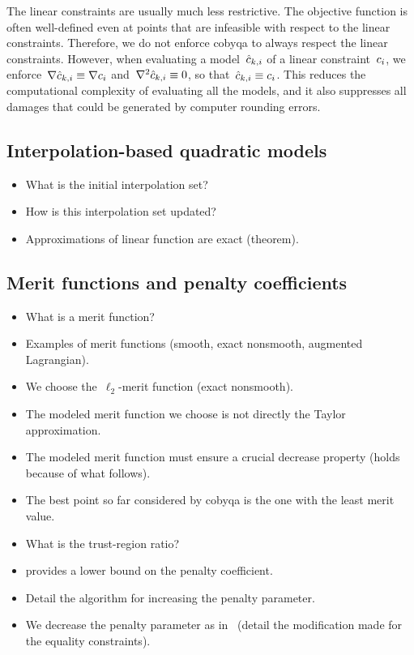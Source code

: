 The linear constraints are usually much less restrictive.
The objective function is often well-defined even at points that are infeasible with respect to the linear constraints.
Therefore, we do not enforce \gls{cobyqa} to always respect the linear constraints.
However, when evaluating a model~$\conm[k]{i}$ of a linear constraint~$c_{i}$, we enforce~$\nabla \conm[k]{i} \equiv \nabla \con{i}$ and~$\nabla^2 \conm[k]{i} \equiv 0$, so that~$\conm[k]{i} \equiv \con{i}$.
This reduces the computational complexity of evaluating all the models, and it also suppresses all damages that could be generated by computer rounding errors.

\subsection{Interpolation-based quadratic models}
\label{subsec:cobyqa-models}

\begin{itemize}
    \item What is the initial interpolation set?
    \item How is this interpolation set updated?
    \item Approximations of linear function are exact (theorem).
\end{itemize}

\subsection{Merit functions and penalty coefficients}
\label{subsec:cobyqa-merit-function}

\begin{itemize}
    \item What is a merit function?
    \item Examples of merit functions (smooth, exact nonsmooth, augmented Lagrangian).
    \item We choose the~$\ell_2$-merit function (exact nonsmooth).
    \item The modeled merit function we choose is not directly the Taylor approximation.
    \item The modeled merit function must ensure a crucial decrease property (holds because of what follows).
    \item The best point so far considered by \gls{cobyqa} is the one with the least merit value.
    \item What is the trust-region ratio?
    \item \Cite[Thm.~14.5.1]{Conn_Gould_Toint_2000} provides a lower bound on the penalty coefficient.
    \item Detail the algorithm for increasing the penalty parameter.
    \item We decrease the penalty parameter as in~\cite{Powell_1994} (detail the modification made for the equality constraints).
\end{itemize}

